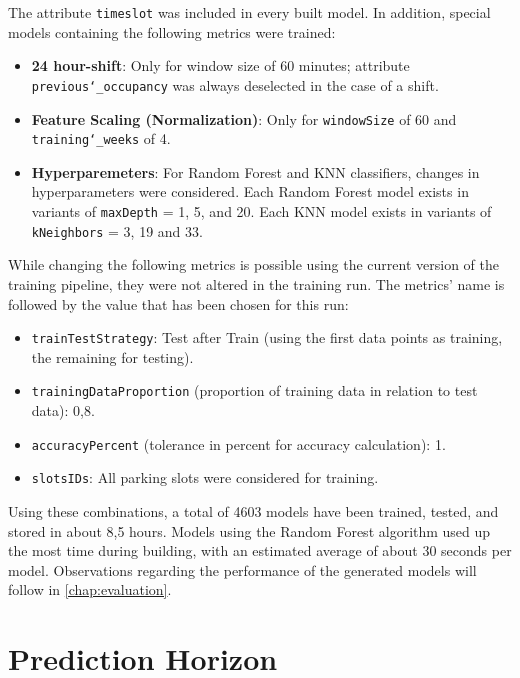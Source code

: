  The attribute \texttt{timeslot} was included in every built model. In addition, special models containing the following metrics were trained:
 
 \begin{itemize}
 	\item \textbf{24 hour-shift}: Only for window size of 60 minutes; attribute \texttt{previous\char`_occupancy} was always deselected in the case of a shift. 
\item \textbf{Feature Scaling (Normalization)}: Only for \texttt{windowSize} of 60 and \texttt{training\char`_weeks} of 4.
\item \textbf{Hyperparemeters}: For Random Forest and KNN classifiers, changes in hyperparameters were considered. Each Random Forest model exists in variants of \texttt{maxDepth} = 1, 5, and 20. Each KNN model exists in variants of \texttt{kNeighbors} = 3, 19 and 33.
 \end{itemize}
 
 While changing the following metrics is possible using the current version of the training pipeline, they were not altered in the training run. The metrics’ name is followed by the value that has been chosen for this run:
 
 \begin{itemize}
 	\item \texttt{trainTestStrategy}: Test after Train (using the first data points as training, the remaining for testing).
\item \texttt{trainingDataProportion} (proportion of training data in relation to test data): 0,8.
\item \texttt{accuracyPercent} (tolerance in percent for accuracy calculation): 1.
\item \texttt{slotsIDs}: All parking slots were considered for training.
 \end{itemize}
 
 Using these combinations, a total of 4603 models have been trained, tested, and stored in about 8,5 hours. Models using the Random Forest algorithm used up the most time during building, with an estimated average of about 30 seconds per model. Observations regarding the performance of the generated models will follow in \autoref{chap:evaluation}.
 
 
 
 \section{Prediction Horizon}

